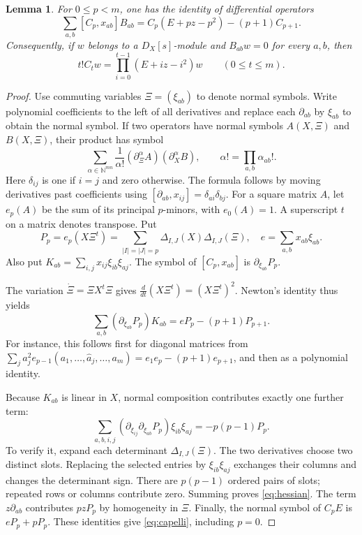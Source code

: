\documentclass[11pt,a4paper]{article}
\numberwithin{equation}{section}
\newtheorem{lemma}[theorem]{Lemma}
\theoremstyle{definition}
\newcommand{\N}{\mathbb N}
\begin{document}
\begin{lemma}\label{lem:capelli}
For $0\le p<m$, one has the identity of differential operators
\begin{equation}\label{eq:capelli}
\sum_{a,b}[C_p,x_{ab}]B_{ab}
    =C_p(E+pz-p^2)-(p+1)C_{p+1}.
\end{equation}
Consequently, if $w$ belongs to a $D_X[s]$-module and
$B_{ab}w=0$ for every $a,b$, then
\begin{equation}\label{eq:commonkernel}
t!C_tw=\prod_{i=0}^{t-1}(E+iz-i^2)w\qquad(0\le t\le m).
\end{equation}
\end{lemma}
\begin{proof}
Use commuting variables $\Xi=(\xi_{ab})$ to denote normal symbols.
Write polynomial coefficients to the left of all derivatives and
replace each $\partial_{ab}$ by $\xi_{ab}$ to obtain the normal symbol.
If two operators have normal symbols $A(X,\Xi)$ and $B(X,\Xi)$,
their product has symbol
\[
\sum_{\alpha\in\N^{mn}}\frac1{\alpha!}
 (\partial_\Xi^\alpha A)(\partial_X^\alpha B),
\qquad \alpha!=\prod_{a,b}\alpha_{ab}!.
\]
Here $\delta_{ij}$ is one if $i=j$ and zero otherwise. The formula
follows by moving derivatives past coefficients using
$[\partial_{ab},x_{ij}]=\delta_{ai}\delta_{bj}$.
For a square matrix $A$, let $e_p(A)$ be the sum of its principal
$p$-minors, with $e_0(A)=1$. A superscript $t$ on a matrix denotes
transpose. Put
\[
P_p=e_p(X\Xi^t)=\sum_{|I|=|J|=p}\Delta_{I,J}(X)\Delta_{I,J}(\Xi),
\quad e=\sum_{a,b}x_{ab}\xi_{ab}.
\]
Also put
$K_{ab}=\sum_{i,j}x_{ij}\xi_{ib}\xi_{aj}$. The symbol of
$[C_p,x_{ab}]$ is $\partial_{\xi_{ab}}P_p$.

The variation $\dot\Xi=\Xi X^t\Xi$ gives
$\frac{d}{dt}(X\Xi^t)=(X\Xi^t)^2$. Newton's identity thus yields
\begin{equation}\label{eq:newtonsymbol}
\sum_{a,b}(\partial_{\xi_{ab}}P_p)K_{ab}
          =eP_p-(p+1)P_{p+1}.
\end{equation}
For instance, this follows first for diagonal matrices from
$\sum_j a_j^2 e_{p-1}(a_1,\ldots,\widehat a_j,\ldots,a_m)
=e_1e_p-(p+1)e_{p+1}$, and then as a polynomial identity.

Because $K_{ab}$ is linear in $X$, normal composition contributes
exactly one further term:
\begin{equation}\label{eq:hessian}
\sum_{a,b,i,j}
 (\partial_{\xi_{ij}}\partial_{\xi_{ab}}P_p)\xi_{ib}\xi_{aj}
                       =-p(p-1)P_p.
\end{equation}
To verify it, expand each determinant $\Delta_{I,J}(\Xi)$. The two
derivatives choose two distinct slots. Replacing the selected entries
by $\xi_{ib}\xi_{aj}$ exchanges their columns and changes the
determinant sign. There are $p(p-1)$ ordered pairs of slots; repeated
rows or columns contribute zero. Summing proves \eqref{eq:hessian}.
The term $z\partial_{ab}$ contributes $pzP_p$ by homogeneity in $\Xi$.
Finally, the normal symbol of $C_pE$ is $eP_p+pP_p$. These identities
give \eqref{eq:capelli}, including $p=0$.


\end{proof}
\end{document}
